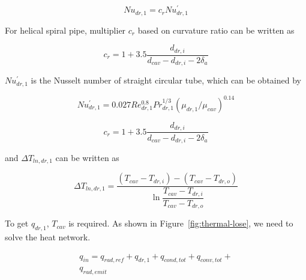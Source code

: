 \documentclass{article}
\begin{document}
\begin{equation*}
	Nu_{dr,1}=c_rNu_{dr,1}^{'}
\end{equation*}

For helical spiral pipe, multiplier $c_r$ based on curvature ratio can be written as~\cite{Pablo2008}

\begin{equation*}
	c_{r}=1+3.5\frac{d_{dr,i}}{d_{cav}-d_{dr,i}-2\delta_{a}}
\end{equation*}

$Nu_{dr,1}^{'}$ is the Nusselt number of straight circular tube, which can be obtained by~\cite{Serth2007}

\begin{equation*}
	Nu_{dr,1}^{'}= 0.027Re_{dr,1}^{0.8}Pr_{dr,1}^{1/3}(\mu_{dr,1}/\mu_{cav})^{0.14}
\end{equation*}

\begin{equation*}
	c_{r}=1+3.5\frac{d_{dr,i}}{d_{cav}-d_{dr,i}-2\delta_{a}}
\end{equation*}

and $\Delta{}T_{ln,dr,1}$ can be written as

\begin{equation*}
	\Delta{}T_{ln,dr,1}=\frac{(T_{cav}-T_{dr,i})-(T_{cav}-T_{dr,o})}{\ln\dfrac{T_{cav}-T_{dr,i}}{T_{cav}-T_{dr,o}}}
\end{equation*}

To get $q_{dr,1}$, $T_{cav}$ is required. As shown in Figure~\ref{fig:thermal-lose}, we need to solve the heat network.

\begin{equation}
\begin{aligned}
	q_{in} = q_{rad,ref}+q_{dr,1}+q_{cond,tot}+q_{conv,tot}+
	\\q_{rad,emit}\label{eq:q_in sum}
\end{aligned}
\end{equation}
\end{document}

